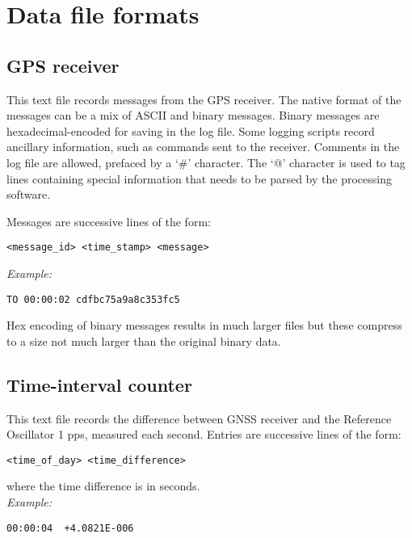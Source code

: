 \section{Data file formats \label{s:DataFileFormat}}

\subsection{GPS receiver}

This text file records messages from the GPS receiver. 
The native format of the messages can be a mix of ASCII and binary messages.
Binary messages are hexadecimal-encoded for saving in the log file. 
Some logging scripts record ancillary information, such as commands sent to the receiver. 
Comments in the log file are allowed, prefaced by a `\#' character. 
The `@' character is used to tag lines containing special information that needs to be parsed by
the processing software.

Messages are successive lines of the form:
\begin{lstlisting}
<message_id> <time_stamp> <message>
\end{lstlisting}
\textit{Example:}
\begin{lstlisting}
TO 00:00:02 cdfbc75a9a8c353fc5
\end{lstlisting}

Hex encoding of binary messages results in much larger files but these compress to a size not much larger
than the original binary data.

\subsection{Time-interval counter \label{s:TICformat}}

This text file records the difference between GNSS receiver and the Reference Oscillator 1 pps,
measured each second. Entries are successive lines of the form:
\begin{lstlisting}
<time_of_day> <time_difference>
\end{lstlisting}
where the time difference is in seconds.\\
\textit{Example:}
\begin{lstlisting}
00:00:04  +4.0821E-006 
\end{lstlisting}







